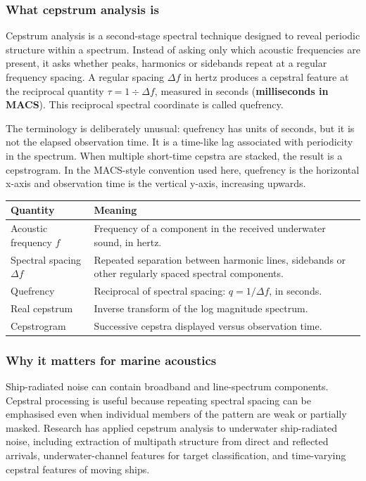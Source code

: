 \subsubsection{What cepstrum analysis is}

Cepstrum analysis is a second-stage spectral technique designed to reveal periodic structure within a spectrum. Instead of asking only which acoustic frequencies are present, it asks whether peaks, harmonics or sidebands repeat at a regular frequency spacing. A regular spacing $\Delta f$ in hertz produces a cepstral feature at the reciprocal quantity $\tau = 1 \div \Delta f$, measured in seconds (\textbf{milliseconds in MACS}). This reciprocal spectral coordinate is called quefrency.

The terminology is deliberately unusual: quefrency has units of seconds, but it is not the elapsed observation time. It is a time-like lag associated with periodicity in the spectrum. When multiple short-time cepstra are stacked, the result is a cepstrogram. In the MACS-style convention used here, quefrency is the horizontal x-axis and observation time is the vertical y-axis, increasing upwards.

\begin{tabularx}{\linewidth}{l X}
    \toprule
    \textbf{Quantity} & \textbf{Meaning} \\
    \midrule
    \rowcolor[gray]{0.8}Acoustic frequency $f$ & Frequency of a component in the received underwater sound, in hertz. \\
    Spectral spacing $\Delta f$ &  Repeated separation between harmonic lines, sidebands or other regularly spaced spectral components. \\
    \rowcolor[gray]{0.8}Quefrency & Reciprocal of spectral spacing: $q = 1/\Delta f$, in seconds.\\
    Real cepstrum & Inverse transform of the log magnitude spectrum. \\
    \rowcolor[gray]{0.8}Cepstrogram & Successive cepstra displayed versus observation time. \\
    \bottomrule
\end{tabularx}

\subsubsection{Why it matters for marine acoustics}

Ship-radiated noise can contain broadband and line-spectrum components. Cepstral processing is useful because repeating spectral spacing can be emphasised even when individual members of the pattern are weak or partially masked. Research has applied cepstrum analysis to underwater ship-radiated noise, including extraction of multipath structure from direct and reflected arrivals, underwater-channel features for target classification, and time-varying cepstral features of moving ships.


